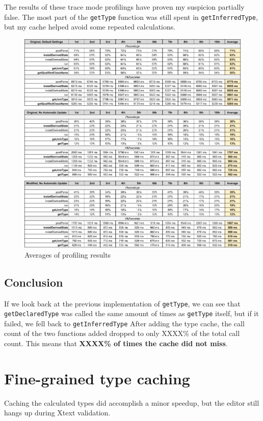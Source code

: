 \documentclass[11pt,a4paper,oneside]{report}
\begin{document}
The results of these trace mode profilings have proven my suspicion partially
false. The most part of the \texttt{getType} function was still spent in
\texttt{getInferredType}, but my cache helped avoid some repeated calculations.

\pagebreak
\begin{figure}[ht]
\centering
\includegraphics[width=150mm,keepaspectratio]{figures/measurements.png}
\caption{Averages of profiling results}
\label{fig:profiling-measurements}
\end{figure}

\subsection{Conclusion}
If we look back at the previous implementation of \texttt{getType}, we can see
that \texttt{getDeclaredType} was called the same amount of times as
\texttt{getType} itself, but if it failed, we fell back to
\texttt{getInferredType} After adding the type cache, the call count of the two
functions added dropped to only XXXX\% of the total call count. This means that
\textbf{XXXX\% of times the cache did not miss}.

\section{Fine-grained type caching}\label{sec:FineGrained}
Caching the calculated types did accomplish a minor speedup, but the editor
still hangs up during Xtext validation.
\end{document}
